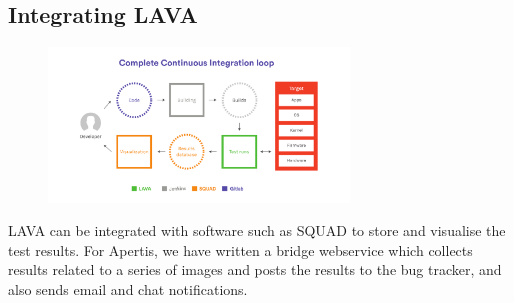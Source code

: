 \documentclass[10pt, a5paper]{article}
\begin{document}
\subsection*{Integrating LAVA}

\begin{center}
\begin{figure}[h!]
  \centering
  \includegraphics[width=8cm]{10_2018_Shadura2.png}
  \label{Shadura2}
\end{figure}
\end{center} 

LAVA can be integrated with software such as SQUAD to store and visualise the test results. For Apertis, we have written a bridge webservice which collects results related to a series of images and posts the results to the bug tracker, and also sends email and chat notifications.
\end{document}
